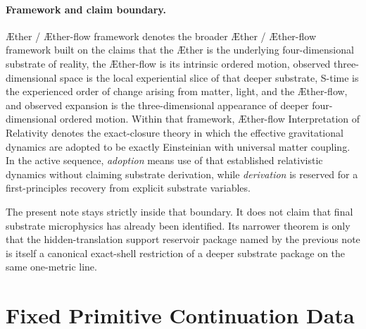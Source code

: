 \documentclass[11pt]{article}
\newcommand{\Aether}{\AE{}ther}
\newcommand{\Aflow}{\AE{}ther-flow}
\newcommand{\TheoryName}{\Aflow{} Interpretation of Relativity}
\newcommand{\TheoryProgram}{\Aether{} / \Aflow{} framework}
\begin{document}
\paragraph{Framework and claim boundary.}
\TheoryProgram{} denotes the broader \Aether{} / \Aflow{} framework built on the claims that the \Aether{} is the underlying four-dimensional substrate of reality, the \Aflow{} is its intrinsic ordered motion, observed three-dimensional space is the local experiential slice of that deeper substrate, S-time is the experienced order of change arising from matter, light, and the \Aflow{}, and observed expansion is the three-dimensional appearance of deeper four-dimensional ordered motion. Within that framework, \TheoryName{} denotes the exact-closure theory in which the effective gravitational dynamics are adopted to be exactly Einsteinian with universal matter coupling. In the active sequence, \emph{adoption} means use of that established relativistic dynamics without claiming substrate derivation, while \emph{derivation} is reserved for a first-principles recovery from explicit substrate variables.

The present note stays strictly inside that boundary. It does not claim that final substrate microphysics has already been identified. Its narrower theorem is only that the hidden-translation support reservoir package named by the previous note is itself a canonical exact-shell restriction of a deeper substrate package on the same one-metric line.

\section{Fixed Primitive Continuation Data}
\end{document}
